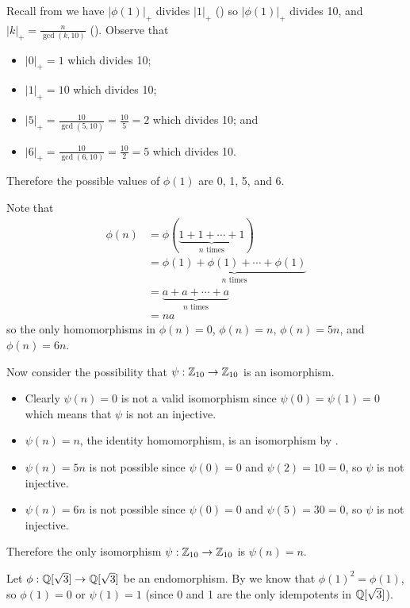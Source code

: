 \begin{questions}
    Recall from  we have $|\phi(1)|_+$ divides $|1|_+$ () so $|\phi(1)|_+$ divides 10, and $|k|_+ = \frac{n}{\gcd(k,10)}$ (). Observe that
    \begin{itemize}
        \item $|0|_+ = 1$ which divides 10;
        \item $|1|_+ = 10$ which divides 10;
        \item $|5|_+ = \frac{10}{\gcd(5,10)} = \frac{10}{5} = 2$ which divides 10; and
        \item $|6|_+ = \frac{10}{\gcd(6,10)} = \frac{10}{2} = 5$ which divides 10.
    \end{itemize}
    Therefore the possible values of $\phi(1)$ are 0, 1, 5, and 6.

    Note that
    \begin{align*}
        \phi(n) &= \phi(\underbrace{1+1+\cdots+1}_{n \text{ times}})\\
        &= \underbrace{\phi(1)+\phi(1)+\cdots+\phi(1)}_{n \text{ times}}\\
        &= \underbrace{a + a + \cdots + a}_{n \text{ times}}\\
        &= na
    \end{align*}
    so the only homomorphisms in $\phi(n) = 0$, $\phi(n) = n$, $\phi(n) = 5n$, and $\phi(n) = 6n$.

    Now consider the possibility that $\psi: \mathbb{Z}_{10} \to \mathbb{Z}_{10}$ is an isomorphism.
    \begin{itemize}
        \item Clearly $\psi(n) = 0$ is not a valid isomorphism since $\psi(0) = \psi(1) = 0$ which means that $\psi$ is not an injective.
        \item $\psi(n) = n$, the identity homomorphism, is an isomorphism by .
        \item $\psi(n) = 5n$ is not possible since $\psi(0) = 0$ and $\psi(2) = 10 = 0$, so $\psi$ is not injective.
        \item $\psi(n) = 6n$ is not possible since $\psi(0) = 0$ and $\psi(5) = 30 = 0$, so $\psi$ is not injective.
    \end{itemize}
    Therefore the only isomorphism $\psi:\mathbb{Z}_{10} \to \mathbb{Z}_{10}$ is $\psi(n) = n$.

    \item Let $\phi: \mathbb{Q}[\sqrt3] \to \mathbb{Q}[\sqrt3]$ be an endomorphism. By  we know that $\phi(1)^2 = \phi(1)$, so $\phi(1) = 0$ or $\psi(1) = 1$ (since 0 and 1 are the only idempotents in $\mathbb{Q}[\sqrt3]$).
    

\end{questions}
